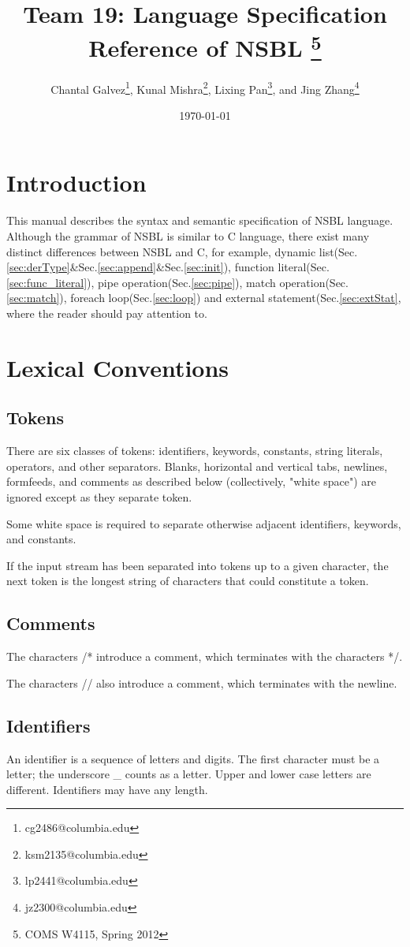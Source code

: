 \documentclass[letterpaper,12pt]{article}
\title {Team 19: Language Specification Reference of NSBL
\footnote{COMS W4115, Spring 2012 }}
\author {
Chantal Galvez\footnote{cg2486@columbia.edu}, 
Kunal Mishra\footnote{ksm2135@columbia.edu}, 
Lixing Pan\footnote{lp2441@columbia.edu},
and Jing Zhang\footnote{jz2300@columbia.edu}}
\date{\today}
\begin{document}
\maketitle
\section{Introduction}
  This manual describes the syntax and semantic specification of NSBL language. Although the grammar of NSBL is similar to C language, there exist many distinct differences between NSBL and C, for example, 
dynamic list(Sec.\ref{sec:derType}\&Sec.\ref{sec:append}\&Sec.\ref{sec:init}), 
function literal(Sec.\ref{sec:func_literal}), 
pipe operation(Sec.\ref{sec:pipe}),
match operation(Sec.\ref{sec:match}),
foreach loop(Sec.\ref{sec:loop})
and external statement(Sec.\ref{sec:extStat},
 where the reader should pay attention to.  

\section{Lexical Conventions}
\subsection{Tokens}
There are six classes of tokens: identifiers, keywords, constants, string literals, operators, and other separators. Blanks, horizontal and vertical tabs, newlines, formfeeds, and comments as described below (collectively, "white space") are ignored except as they separate token. \newline

Some white space is required to separate otherwise adjacent identifiers, keywords, and constants. \newline

If the input stream has been separated into tokens up to a given character, the next token is the longest string of characters that could constitute a token.

\subsection{Comments}
  The characters /* introduce a comment, which terminates with the characters */.\newline

  The characters // also introduce a comment, which terminates with the newline.

\subsection{Identifiers}
An identifier is a sequence of letters and digits. The first character must be a letter; the underscore \_ counts as a letter. Upper and lower case letters are different. Identifiers may have any length.
\end{document}

